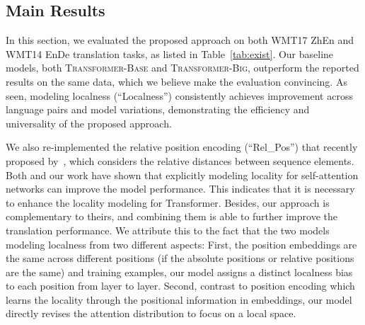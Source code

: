 \documentclass[11pt,a4paper]{article}
\begin{document}
\subsection{Main Results}

In this section, we evaluated the proposed approach on both WMT17 ZhEn and WMT14 EnDe translation tasks, as listed in Table~\ref{tab:exist}. 
Our baseline models, both \textsc{Transformer-Base} and \textsc{Transformer-Big}, outperform the reported results on the same data, which we believe make the evaluation convincing. As seen, modeling localness (``Localness'') consistently achieves improvement across language pairs and model variations, demonstrating the efficiency and universality of the proposed  approach.

We also re-implemented the relative position encoding (``Rel\_Pos'') that recently proposed  by~, which considers the relative distances between sequence elements.
{Both  and our work have shown that explicitly modeling locality for self-attention networks can improve the model performance.} This indicates that it is necessary to enhance the locality modeling for Transformer. Besides, our approach is complementary to theirs, and combining them is able to further improve the translation performance. We attribute this to the fact that the two models modeling localness from two different aspects: { First, the position embeddings are the same across different positions (if the absolute positions or relative positions are the same) and training examples, our model assigns a distinct localness bias to each position from layer to layer. Second, contrast to position encoding which learns the locality through the positional information in embeddings, our model directly revises the attention distribution to focus on a local space. 
}
\end{document}
